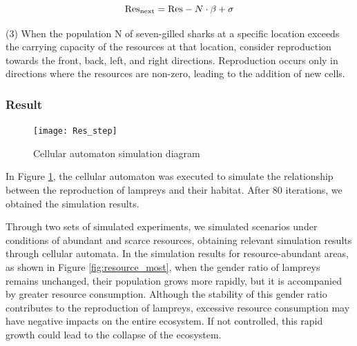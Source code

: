 \documentclass[CTeX = true]{mcmthesis}  %
\begin{document}
$${\rm Res}_{\rm next} = {\rm Res} - N \cdot \beta + \sigma$$

(3) When the population N of seven-gilled sharks at a specific location exceeds the carrying capacity of the resources at that location, consider reproduction towards the front, back, left, and right directions. Reproduction occurs only in directions where the resources are non-zero, leading to the addition of new cells.

\subsubsection{Result}
\begin{figure}[htbp]
       \centering    
   \texttt{[image: Res\_step]}
     \caption{Cellular automaton simulation diagram}
     \label{fig:Res_step}
\end{figure}

In Figure \ref{fig:Res_step}, the cellular automaton was executed to simulate the relationship between the reproduction of lampreys and their habitat. After 80 iterations, we obtained the simulation results.
  
Through two sets of simulated experiments, we simulated scenarios under conditions of abundant and scarce resources, obtaining relevant simulation results through cellular automata. In the simulation results for resource-abundant areas, as shown in Figure \ref{fig:resource_most}, when the gender ratio of lampreys remains unchanged, their population grows more rapidly, but it is accompanied by greater resource consumption. Although the stability of this gender ratio contributes to the reproduction of lampreys, excessive resource consumption may have negative impacts on the entire ecosystem. If not controlled, this rapid growth could lead to the collapse of the ecosystem.
\end{document}
